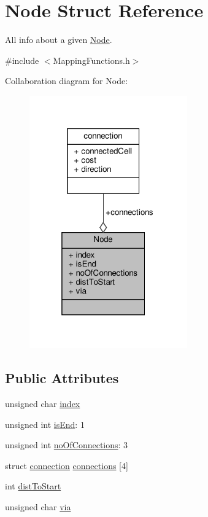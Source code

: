 \hypertarget{structNode}{}\section{Node Struct Reference}
\label{structNode}


All info about a given \hyperlink{structNode}{Node}.  




{\ttfamily \#include $<$Mapping\+Functions.\+h$>$}



Collaboration diagram for Node\+:
\nopagebreak
\begin{figure}[H]
\begin{center}
\leavevmode
\includegraphics[width=193pt]{structNode__coll__graph}
\end{center}
\end{figure}
\subsection*{Public Attributes}
\begin{DoxyCompactItemize}
\item 
unsigned char \hyperlink{structNode_a77c45b2ff49ea5dc4195fed43e7787c2}{index}
\item 
unsigned int \hyperlink{structNode_abc8ade5cf38b553b33542473c104272a}{is\+End}\+: 1
\item 
unsigned int \hyperlink{structNode_a1ca0af175fe450a22f8d8625f0b58cbd}{no\+Of\+Connections}\+: 3
\item 
struct \hyperlink{structconnection}{connection} \hyperlink{structNode_a1552d162ffa511bd47eb78cfe89240d1}{connections} \mbox{[}4\mbox{]}
\item 
int \hyperlink{structNode_ae66c167e6d151204d510f418a81f4afc}{dist\+To\+Start}
\item 
unsigned char \hyperlink{structNode_a63fd18834461e80cc0ce292269f6f169}{via}
\end{DoxyCompactItemize}


